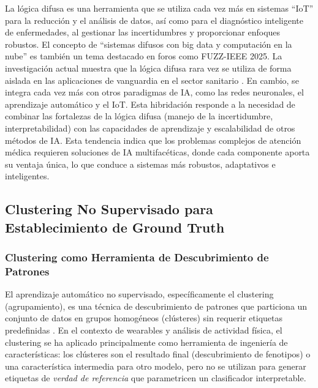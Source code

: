 La lógica difusa es una herramienta que se utiliza cada vez más en sistemas ``IoT'' para la reducción y el análisis de datos, así como para el diagnóstico inteligente de enfermedades, al gestionar las incertidumbres y proporcionar enfoques robustos. El concepto de ``sistemas difusos con big data y computación en la nube'' es también un tema destacado en foros como FUZZ-IEEE 2025. La investigación actual muestra que la lógica difusa rara vez se utiliza de forma aislada en las aplicaciones de vanguardia en el sector sanitario \citep{Alam2022Disease}. En cambio, se integra cada vez más con otros paradigmas de IA, como las redes neuronales, el aprendizaje automático y el IoT. Esta hibridación responde a la necesidad de combinar las fortalezas de la lógica difusa (manejo de la incertidumbre, interpretabilidad) con las capacidades de aprendizaje y escalabilidad de otros métodos de IA. Esta tendencia indica que los problemas complejos de atención médica requieren soluciones de IA multifacéticas, donde cada componente aporta su ventaja única, lo que conduce a sistemas más robustos, adaptativos e inteligentes.

\subsection{Clustering No Supervisado para Establecimiento de Ground Truth}
\label{subsec:clustering_ground_truth}

\subsubsection{Clustering como Herramienta de Descubrimiento de Patrones}
\label{subsubsec:clustering_herramienta}

El aprendizaje automático no supervisado, específicamente el clustering (agrupamiento), es una técnica de descubrimiento de patrones que particiona un conjunto de datos en grupos homogéneos (clústeres) sin requerir etiquetas predefinidas \citep{Yoo2012DataMining}. En el contexto de wearables y análisis de actividad física, el clustering se ha aplicado principalmente como herramienta de ingeniería de características: los clústeres son el resultado final (descubrimiento de fenotipos) o una característica intermedia para otro modelo, pero no se utilizan para generar etiquetas de \textit{verdad de referencia} que parametricen un clasificador interpretable.

